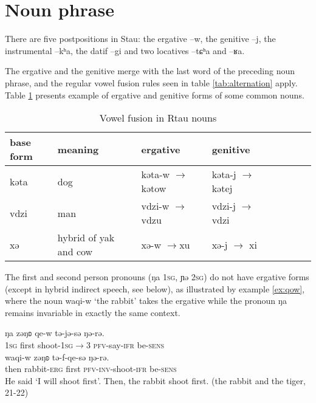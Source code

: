 \documentclass[oneside,a4paper,11pt]{article}
\newcommand{\ipa}[1]{{\phon #1}} %
\begin{document}
 

 \section{Noun phrase}
 
There are five postpositions in Stau: the ergative \ipa{--w}, the genitive \ipa{--j}, the instrumental \ipa{--kʰa}, the datif \ipa{--gi} and two locatives \ipa{--tɕʰa} and \ipa{--ʁa}.


The ergative and the genitive merge with the last word of the preceding noun phrase, and the regular vowel fusion rules seen in table \ref{tab:alternation} apply. Table \ref{tab:alternation.noun} presents example of ergative and genitive forms of some common nouns.

\begin{table}[H]
\caption{Vowel fusion in Rtau nouns} \label{tab:alternation.noun} \centering
\begin{tabular}{l|lllllll}
\toprule
base form & meaning & ergative & genitive \\
\midrule
\ipa{kəta} & dog & \ipa{kəta-w} $\rightarrow$ \ipa{kətow} & \ipa{kəta-j} $\rightarrow$ \ipa{kətej} & \\
\ipa{vdzi} & man & \ipa{vdzi-w} $\rightarrow$  \ipa{vdzu} & \ipa{vdzi-j} $\rightarrow$ \ipa{vdzi} & \\
\ipa{xə} & hybrid of yak and cow &\ipa{xə-w}  $\rightarrow$\ipa{xu} & \ipa{xə-j} $\rightarrow$ \ipa{xi} & \\
\bottomrule
\end{tabular}
\end{table}

The first and second person pronouns (\ipa{ŋa} \textsc{1sg}, \ipa{ɲə} \textsc{2sg}) do not have ergative forms (except in hybrid indirect speech, see below), as illustrated by example \ref{ex:qow}, where the noun \ipa{waqi-w}  `the rabbit' takes the ergative while the pronoun \ipa{ŋa} remains invariable in exactly the same context.
 \begin{exe}
\ex \label{ex:qow}
\gll
\ipa{ŋa} 	\ipa{zəŋʚ} 	\ipa{qe-w} \ipa{tə-jə-sə} 	\ipa{ŋə-rə.} \\
\textsc{1sg} first shoot-\textsc{1sg$\rightarrow$3} \textsc{pfv}-say-\textsc{ifr} be-\textsc{sens}\\
\gll \ipa{tɕʰəge,} 	\ipa{waqi-w} 	\ipa{zəŋʚ} 	\ipa{tə-f-qe-sə} 	\ipa{ŋə-rə.} 	\\
then rabbit-\textsc{erg} first \textsc{pfv-inv}-shoot-\textsc{ifr} be-\textsc{sens}\\
\glt He said `I will shoot first'. Then, the rabbit shoot first. (the rabbit and the tiger, 21-22)
\end{exe}
\end{document}
